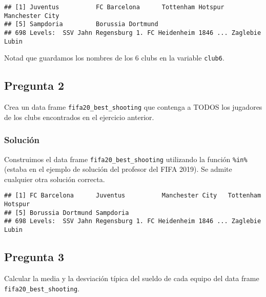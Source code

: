 \documentclass[
]{article}
\newenvironment{Shaded}{\begin{snugshade}}{\end{snugshade}}
\newcommand{\KeywordTok}[1]{\textcolor[rgb]{0.13,0.29,0.53}{\textbf{#1}}}
\newcommand{\NormalTok}[1]{#1}
\newcommand{\OperatorTok}[1]{\textcolor[rgb]{0.81,0.36,0.00}{\textbf{#1}}}
\newcommand{\StringTok}[1]{\textcolor[rgb]{0.31,0.60,0.02}{#1}}
\begin{document}
\begin{verbatim}
## [1] Juventus          FC Barcelona      Tottenham Hotspur Manchester City  
## [5] Sampdoria         Borussia Dortmund
## 698 Levels:  SSV Jahn Regensburg 1. FC Heidenheim 1846 ... Zaglebie Lubin
\end{verbatim}

Notad que guardamos los nombres de los 6 clubs en la variable
\texttt{club6}.

\hypertarget{pregunta-2}{%
\subsection{Pregunta 2}\label{pregunta-2}}

Crea un data frame \texttt{fifa20\_best\_shooting} que contenga a TODOS
los jugadores de los clubs encontrados en el ejercicio anterior.

\hypertarget{soluciuxf3n-2}{%
\subsubsection{Solución}\label{soluciuxf3n-2}}

Construimos el data frame \texttt{fifa20\_best\_shooting} utilizando la
función \texttt{\%in\%} (estaba en el ejemplo de solución del profesor
del FIFA 2019). Se admite cualquier otra solución correcta.

\begin{Shaded}
\end{Shaded}

\begin{verbatim}
## [1] FC Barcelona      Juventus          Manchester City   Tottenham Hotspur
## [5] Borussia Dortmund Sampdoria        
## 698 Levels:  SSV Jahn Regensburg 1. FC Heidenheim 1846 ... Zaglebie Lubin
\end{verbatim}

\hypertarget{pregunta-3}{%
\subsection{Pregunta 3}\label{pregunta-3}}

Calcular la media y la desviación típica del sueldo de cada equipo del
data frame \texttt{fifa20\_best\_shooting}.
\end{document}
